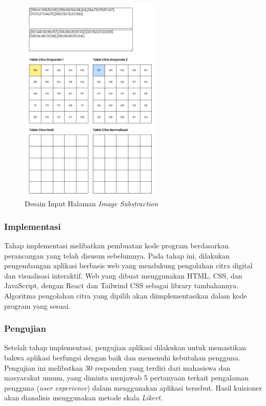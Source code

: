 \begin{enumerate}[leftmargin=1cm, itemindent=0.6cm,labelwidth=15pt, labelsep=5pt, listparindent=1cm,align=left]
\begin{enumerate}[leftmargin=1cm, itemindent=0.6cm,labelwidth=15pt, labelsep=5pt, listparindent=1cm,align=left]
        \begin{figure}[ht]
    	      \includegraphics[width=0.6\textwidth, center]{images/input-substraction.png}
              \caption{Desain Input Halaman \textit{Image Substraction}}
        \end{figure}

    \pagebreak

\end{enumerate}
\end{enumerate}

\subsubsection{Implementasi}

    Tahap implementasi melibatkan pembuatan kode program berdasarkan perancangan yang telah disusun sebelumnya. Pada tahap ini, dilakukan pengembangan aplikasi berbasis web yang mendukung pengolahan citra digital dan visualisasi interaktif. Web yang dibuat menggunakan HTML, CSS, dan JavaScript, dengan React dan Tailwind CSS sebagai library tambahannya. Algoritma pengolahan citra yang dipilih akan diimplementasikan dalam kode program yang sesuai.

\subsubsection{Pengujian}

        Setelah tahap implementasi, pengujian aplikasi dilakukan untuk memastikan bahwa aplikasi berfungsi dengan baik dan memenuhi kebutuhan pengguna. Pengujian ini melibatkan 30 responden yang terdiri dari mahasiswa dan masyarakat umum, yang diminta menjawab 5 pertanyaan terkait pengalaman pengguna (\textit{user experience}) dalam menggunakan aplikasi tersebut. Hasil kuisioner akan dianalisis menggunakan metode skala \textit{Likert}.

